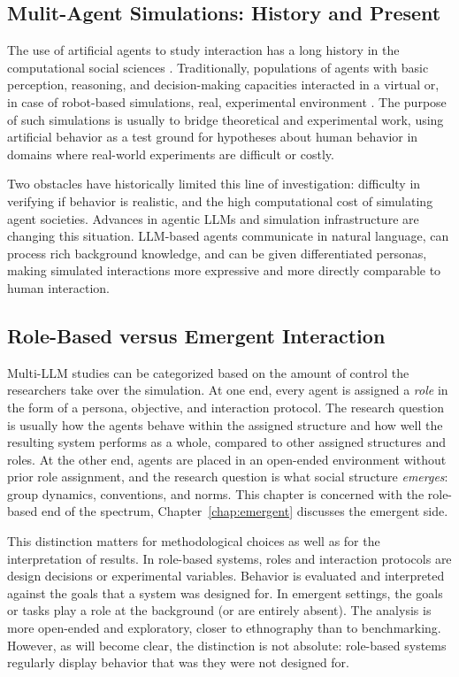 \subsection{Mulit-Agent Simulations: History and Present}
The use of artificial agents to study interaction has a long history in the computational social sciences \citep{epstein1996growing,macal_tutorial_2010}. Traditionally, populations of agents with basic perception, reasoning, and decision-making capacities interacted in a virtual or, in case of robot-based simulations, real, experimental environment \citep{steels1995self,shoham2008multiagent}. The purpose of such simulations is usually to bridge theoretical and experimental work, using artificial behavior as a test ground for hypotheses about human behavior in domains where real-world experiments are difficult or costly. 

Two obstacles have historically limited this line of investigation: difficulty in verifying if behavior is realistic, and the high computational cost of simulating agent societies. Advances in agentic LLMs and simulation infrastructure \citep{rutherford2024jaxmarl} are changing this situation. LLM-based agents communicate in natural language, can process rich background knowledge, and can be given differentiated personas, making simulated interactions more expressive and more directly comparable to human interaction. 

\subsection{Role-Based versus Emergent Interaction}
Multi-LLM studies can be categorized based on the amount of control the researchers take over the simulation. At one end, every agent is assigned a \emph{role} in the form of a persona, objective, and interaction protocol. The research question is usually how the agents behave within the assigned structure and how well the resulting system performs as a whole, compared to other assigned structures and roles. At the other end, agents are placed in an open-ended environment without prior role assignment, and the research question is what social structure \emph{emerges}: group dynamics, conventions, and norms. This chapter is concerned with the role-based end of the spectrum, Chapter~\ref{chap:emergent} discusses the emergent side. 

This distinction matters for methodological choices as well as for the interpretation of results. In role-based systems, roles and interaction protocols are design decisions or experimental variables. Behavior is evaluated and interpreted against the goals that a system was designed for. In emergent settings, the goals or tasks play a role  at the background (or are entirely absent). The analysis is more open-ended and exploratory, closer to ethnography than to benchmarking. However, as will become clear, the distinction is not absolute: role-based systems regularly display  behavior that was they were not designed for.

